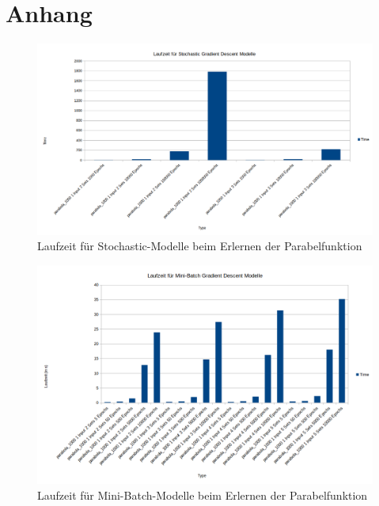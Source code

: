 \chapter{Anhang}

\begin{figure}[htbp]
	\centering
	\includegraphics[angle=-90,totalheight=0.66\textheight]{images/charts/StochasticGradientTimeParabola.png}
	\caption{Laufzeit für Stochastic-Modelle beim Erlernen der Parabelfunktion}
\end{figure}

\begin{figure}[htbp]
	\centering
	\includegraphics[angle=-90,totalheight=\textheight]{images/charts/Mini-BatchGradientTimeParabola.png}
	\caption{Laufzeit für Mini-Batch-Modelle beim Erlernen der Parabelfunktion}
\end{figure}

